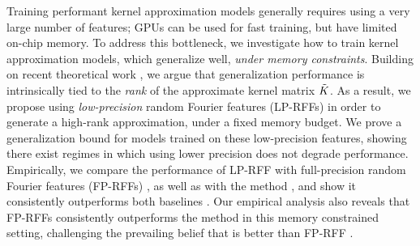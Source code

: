 



Training performant kernel approximation models generally requires using a very large number of features; GPUs can be used for fast training, but have limited on-chip memory. To address this bottleneck, we investigate how to train kernel approximation models, which generalize well, \emph{under memory constraints}.  Building on recent theoretical work \citep{avron17,musco17}, we argue that generalization performance is intrinsically tied to the \emph{rank} of the approximate kernel matrix $\tilde{K}$. As a result, we propose using \emph{low-precision} random Fourier features (LP-RFFs) in order to generate a high-rank approximation, under a fixed memory budget. We prove a generalization bound for models trained on these low-precision features, showing there exist regimes in which using lower precision does not degrade performance. Empirically, we compare the performance of LP-RFF with full-precision random Fourier features (FP-RFFs) \citep{rahimi07random}, as well as with the \Nystrom method \citep{nystrom}, and show it consistently outperforms both baselines . Our empirical analysis also reveals that FP-RFFs consistently outperforms the \Nystrom method in this memory constrained setting, challenging the prevailing belief that \Nystrom is better than FP-RFF \citep{nysvsrff12}.




